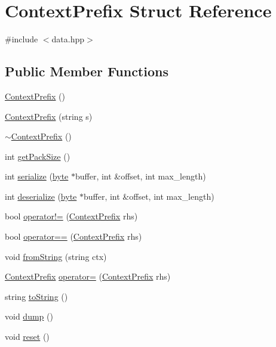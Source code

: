 \hypertarget{struct_context_prefix}{
\section{ContextPrefix Struct Reference}
\label{struct_context_prefix}
}


{\ttfamily \#include $<$data.hpp$>$}\subsection*{Public Member Functions}
\begin{DoxyCompactItemize}
\item 
\hyperlink{struct_context_prefix_a379b1aff6ff34fbed86a70a091434d19}{ContextPrefix} ()
\item 
\hyperlink{struct_context_prefix_a967de73f3ce083123324c5a03e69d5c8}{ContextPrefix} (string s)
\item 
\hyperlink{struct_context_prefix_a5f55e9348a101c600946f76034d6f93f}{$\sim$ContextPrefix} ()
\item 
int \hyperlink{struct_context_prefix_a6d30f468ca52d1dce17ee24804892d52}{getPackSize} ()
\item 
int \hyperlink{struct_context_prefix_a324733817553bbc909f18acd01f697a6}{serialize} (\hyperlink{engine_8hpp_a0c8186d9b9b7880309c27230bbb5e69d}{byte} $\ast$buffer, int \&offset, int max\_\-length)
\item 
int \hyperlink{struct_context_prefix_aaacd69ff83b8a9788a603eaed58cd4e5}{deserialize} (\hyperlink{engine_8hpp_a0c8186d9b9b7880309c27230bbb5e69d}{byte} $\ast$buffer, int \&offset, int max\_\-length)
\item 
bool \hyperlink{struct_context_prefix_ab1e1301d901aa7c4efeef5927bcdb356}{operator!=} (\hyperlink{struct_context_prefix}{ContextPrefix} rhs)
\item 
bool \hyperlink{struct_context_prefix_a8bc65e87aaf036594bd0d5a14da4402e}{operator==} (\hyperlink{struct_context_prefix}{ContextPrefix} rhs)
\item 
void \hyperlink{struct_context_prefix_a793d4b68722e1edd3e1a6272535be5fe}{fromString} (string ctx)
\item 
\hyperlink{struct_context_prefix}{ContextPrefix} \hyperlink{struct_context_prefix_aeab1c6d784c133599e95d7bf10fdfff6}{operator=} (\hyperlink{struct_context_prefix}{ContextPrefix} rhs)
\item 
string \hyperlink{struct_context_prefix_ab31c3c3cafc8c6ddf9d755184b7bc678}{toString} ()
\item 
void \hyperlink{struct_context_prefix_ac390a1751dabd906e901ba491f94cc9d}{dump} ()
\item 
void \hyperlink{struct_context_prefix_af68366f850532d0a204ba1cbabc403cb}{reset} ()
\end{DoxyCompactItemize}
